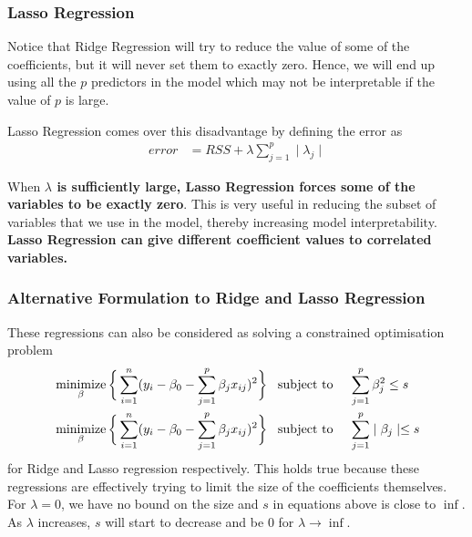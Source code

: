 \documentclass[11pt, a4paper]{article}
\DeclareMathOperator*{\minimize}{minimize}
\begin{document}
    
    \subsubsection{Lasso Regression}
    Notice that Ridge Regression will try to reduce the value of some of the coefficients, but it will never set them to exactly zero. Hence, we will end up using all the $p$ predictors in the model which may not be interpretable if the value of $p$ is large.\newline

    Lasso Regression comes over this disadvantage by defining the error as
    \begin{align*}
        error &= RSS + \lambda \sum_{j=1}^{p}\mid \lambda_{j} \mid
    \end{align*}

    When \textbf{$\lambda$ is sufficiently large, Lasso Regression forces some of the variables to be exactly zero}. This is very useful in reducing the subset of variables that we use in the model, thereby increasing model interpretability.\newline
    \textbf{Lasso Regression can give different coefficient values to correlated variables.}


    \subsubsection{Alternative Formulation to Ridge and Lasso Regression}
    These regressions can also be considered as solving a constrained optimisation problem
    \begin{align*}
        &\minimize_{\beta}  \bigg\{\sum_{i=1}^{n} (y_{i} - \beta_{0} - \sum_{j=1}^{p}\beta_{j}x_{ij})^{2} \bigg\} \text{\;\;\;subject to\;} &&\sum_{j=1}^{p}\beta_{j}^{2} \leq s \\
        &\minimize_{\beta}  \bigg\{\sum_{i=1}^{n} (y_{i} - \beta_{0} - \sum_{j=1}^{p}\beta_{j}x_{ij})^{2} \bigg\} \text{\;\;\;subject to\;} &&\sum_{j=1}^{p}\mid \beta_{j} \mid \leq s
    \end{align*}
    for Ridge and Lasso regression respectively. This holds true because these regressions are effectively trying to limit the size of the coefficients themselves. For $\lambda = 0$, we have no bound on the size and $s$ in equations above is close to $\inf$. As $\lambda$ increases, $s$ will start to decrease and be $0$ for $\lambda \to \inf$. \newline
\end{document}
